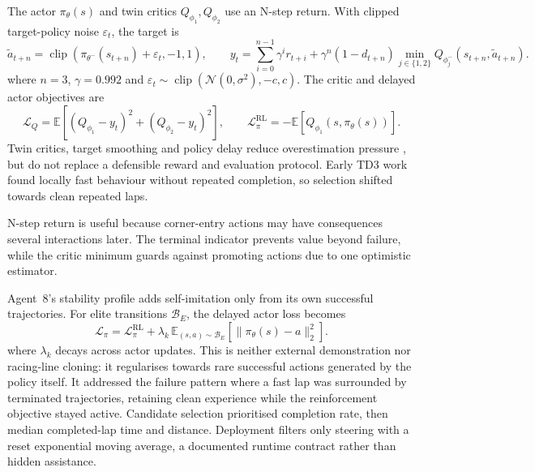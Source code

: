 The actor $\pi_\theta(s)$ and twin critics $Q_{\phi_1},Q_{\phi_2}$ use an N-step return. With clipped target-policy noise $\varepsilon_t$, the target is
\begin{equation*}
  \tilde{a}_{t+n}=\operatorname{clip}\!\left(\pi_{\theta^-}(s_{t+n})+\varepsilon_t,-1,1\right),
  \qquad
  y_t=\sum_{i=0}^{n-1}\gamma^ir_{t+i}+\gamma^n(1-d_{t+n})
  \min_{j\in\{1,2\}}Q_{\phi_j^-}(s_{t+n},\tilde{a}_{t+n}).
\end{equation*}
where $n=3$, $\gamma=0.992$ and $\varepsilon_t\sim\operatorname{clip}(\mathcal{N}(0,\sigma^2),-c,c)$. The critic and delayed actor objectives are
\begin{equation*}
  \mathcal{L}_Q=\mathbb{E}\!\left[(Q_{\phi_1}-y_t)^2+(Q_{\phi_2}-y_t)^2\right],
  \qquad
  \mathcal{L}_{\pi}^{\mathrm{RL}}=-\mathbb{E}\!\left[Q_{\phi_1}(s,\pi_\theta(s))\right].
\end{equation*}
Twin critics, target smoothing and policy delay reduce overestimation pressure \parencite{fujimoto2018}, but do not replace a defensible reward and evaluation protocol. Early TD3 work found locally fast behaviour without repeated completion, so selection shifted towards clean repeated laps.

N-step return is useful because corner-entry actions may have consequences several interactions later. The terminal indicator prevents value beyond failure, while the critic minimum guards against promoting actions due to one optimistic estimator.

Agent~8's stability profile adds self-imitation only from its own successful trajectories. For elite transitions $\mathcal{B}_E$, the delayed actor loss becomes
\begin{equation*}
  \mathcal{L}_{\pi}=\mathcal{L}_{\pi}^{\mathrm{RL}}+
  \lambda_k\,\mathbb{E}_{(s,a)\sim\mathcal{B}_E}\!\left[\lVert\pi_\theta(s)-a\rVert_2^2\right].
\end{equation*}
where $\lambda_k$ decays across actor updates. This is neither external demonstration nor racing-line cloning: it regularises towards rare successful actions generated by the policy itself. It addressed the failure pattern where a fast lap was surrounded by terminated trajectories, retaining clean experience while the reinforcement objective stayed active. Candidate selection prioritised completion rate, then median completed-lap time and distance. Deployment filters only steering with a reset exponential moving average, a documented runtime contract rather than hidden assistance.

